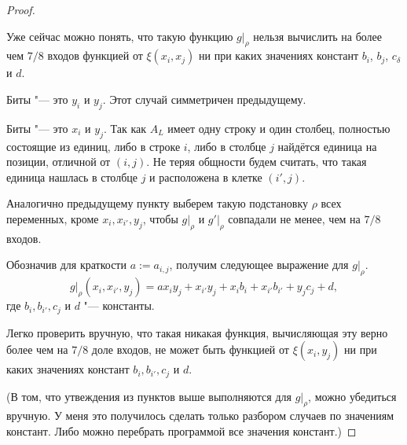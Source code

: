 \documentclass[oneside, a4paper]{article}
\theoremstyle{definition}
\theoremstyle{remark}
\begin{document}
\begin{proof}
\begin{description}
Уже сейчас можно понять, что такую функцию $g \rvert _ \rho$ нельзя вычислить на
более чем $7/8$ входов функцией от $\xi(x_i, x_j)$ ни при каких значениях констант
$b_i$, $b_j$, $c_\delta$ и $d$.


\item{Биты "--- это $y_i$ и $y_j$.} Этот случай симметричен предыдущему.
\item{Биты "--- это $x_i$ и $y_j$.} Так как $A_L$ имеет одну строку и один
столбец, полностью состоящие из единиц, либо в строке $i$, либо в столбце $j$
найдётся единица на позиции, отличной от $(i, j)$. Не теряя общности будем
считать, что такая единица нашлась в столбце $j$ и расположена в клетке $(i',
j)$.

Аналогично предыдущему пункту выберем такую подстановку $\rho$ всех переменных,
кроме $x_i, x_{i'}, y_j$, чтобы $g \rvert _ \rho$ и $g' \rvert _ \rho$ совпадали
не менее, чем на $7/8$ входов.

Обозначив для краткости $a := a_{i, j}$, получим следующее выражение для $g
\rvert _ \rho$.
\[
g \rvert _ \rho (x_i, x_{i'}, y_j) = a x_i y_j + x_{i'} y_j + x_i b_i + x_{i'} b_{i'} + y_j c_j + d,
\]
где $b_{i}, b_{i'}, c_j$ и $d$ "--- константы.

Легко проверить вручную, что такая никакая функция, вычисляющая эту верно более
чем на $7/8$ доле входов, не может быть функцией от $\xi(x_i, y_j)$ ни при каких
значениях констант $b_{i}, b_{i'}, c_j$ и $d$.
\end{description}

(В том, что утвеждения из пунктов выше выполняются для $g \rvert _ \rho$, можно
убедиться вручную. У меня это получилось сделать только разбором случаев по
значениям констант. Либо можно перебрать программой все значения констант.)
\end{proof}
\end{document}
